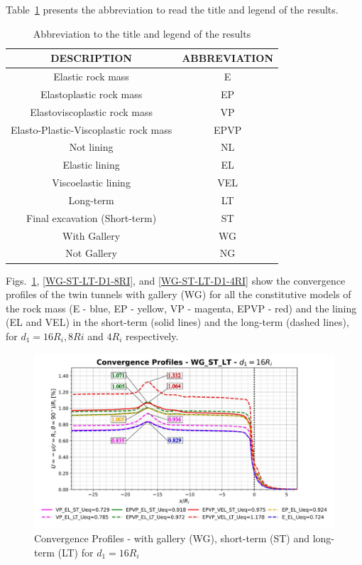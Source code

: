 \documentclass[a4paper,fleqn]{cas-sc}
\begin{document}
Table~\ref{table3} presents the abbreviation to read the title and legend of the results.

\begin{table}
	\caption{Abbreviation to the title and legend of the results}
	\label{table3}
	\centering
	\renewcommand{\arraystretch}{1.25}
	\begin{tabular}{c c}
		\hline
		\multicolumn{1}{c}{DESCRIPTION} &
		\multicolumn{1}{c}{ABBREVIATION} \\
		\hline
		Elastic rock mass & E \\
		Elastoplastic rock mass & EP \\
		Elastoviscoplastic rock mass & VP \\
		Elasto-Plastic-Viscoplastic rock mass & EPVP \\
		Not lining & NL \\
		Elastic lining & EL \\
		Viscoelastic lining & VEL \\
		Long-term & LT \\
		Final excavation (Short-term) & ST \\
		With Gallery & WG \\
		Not Gallery & NG \\			
		\hline
	\end{tabular}
	\normalsize
\end{table}
\FloatBarrier

Figs.~\ref{WG-ST-LT-D1-16RI}, \ref{WG-ST-LT-D1-8RI}, and \ref{WG-ST-LT-D1-4RI} show the convergence profiles of the twin tunnels with gallery (WG) for all the constitutive models of the rock mass (E - blue, EP - yellow, VP - magenta, EPVP - red) and the lining (EL and VEL) in the short-term (solid lines) and the long-term (dashed lines), for $d_1 = 16R_i, 8Ri$ and $4R_i$ respectively.

\begin{figure}[h!]
	\centering
	\includegraphics[scale=0.5]{Convergence Profiles - WG_ST_LT - $d_1=16R_i$.pdf}
	\caption{Convergence Profiles - with gallery (WG), short-term (ST) and long-term (LT) for $d_1 = 16R_i$}
	\label{WG-ST-LT-D1-16RI}
\end{figure}
\FloatBarrier
\end{document}
